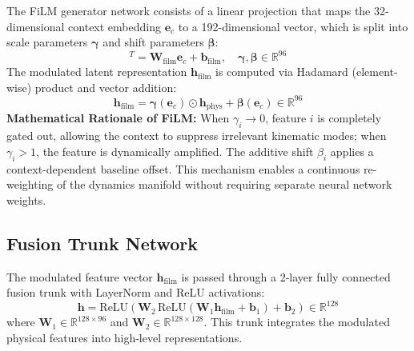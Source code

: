 \documentclass[10pt,a4paper]{article}
\begin{document}
The FiLM generator network consists of a linear projection that maps the 32-dimensional context embedding $\mathbf{e}_c$ to a 192-dimensional vector, which is split into scale parameters $\bm{\gamma}$ and shift parameters $\bm{\beta}$:
\begin{equation}
[\bm{\gamma}(\mathbf{e}_c)^T, \, \bm{\beta}(\mathbf{e}_c)^T]^T = \mathbf{W}_{\mathrm{film}} \mathbf{e}_c + \mathbf{b}_{\mathrm{film}}, \quad \bm{\gamma}, \bm{\beta} \in \mathbb{R}^{96}
\label{eq:film_gen}
\end{equation}
The modulated latent representation $\mathbf{h}_{\mathrm{film}}$ is computed via Hadamard (element-wise) product and vector addition:
\begin{equation}
\mathbf{h}_{\mathrm{film}} = \bm{\gamma}(\mathbf{e}_c) \odot \mathbf{h}_{\mathrm{phys}} + \bm{\beta}(\mathbf{e}_c) \in \mathbb{R}^{96}
\label{eq:film_modulation}
\end{equation}
\textbf{Mathematical Rationale of FiLM:} When $\gamma_i \rightarrow 0$, feature $i$ is completely gated out, allowing the context to suppress irrelevant kinematic modes; when $\gamma_i > 1$, the feature is dynamically amplified. The additive shift $\beta_i$ applies a context-dependent baseline offset. This mechanism enables a continuous re-weighting of the dynamics manifold without requiring separate neural network weights.

\subsection{Fusion Trunk Network}
The modulated feature vector $\mathbf{h}_{\mathrm{film}}$ is passed through a 2-layer fully connected fusion trunk with LayerNorm and ReLU activations:
\begin{equation}
\mathbf{h} = \mathrm{ReLU}\left(\mathbf{W}_2 \, \mathrm{ReLU}(\mathbf{W}_1 \mathbf{h}_{\mathrm{film}} + \mathbf{b}_1) + \mathbf{b}_2\right) \in \mathbb{R}^{128}
\label{eq:fusion_trunk}
\end{equation}
where $\mathbf{W}_1 \in \mathbb{R}^{128 \times 96}$ and $\mathbf{W}_2 \in \mathbb{R}^{128 \times 128}$. This trunk integrates the modulated physical features into high-level representations.
\end{document}
